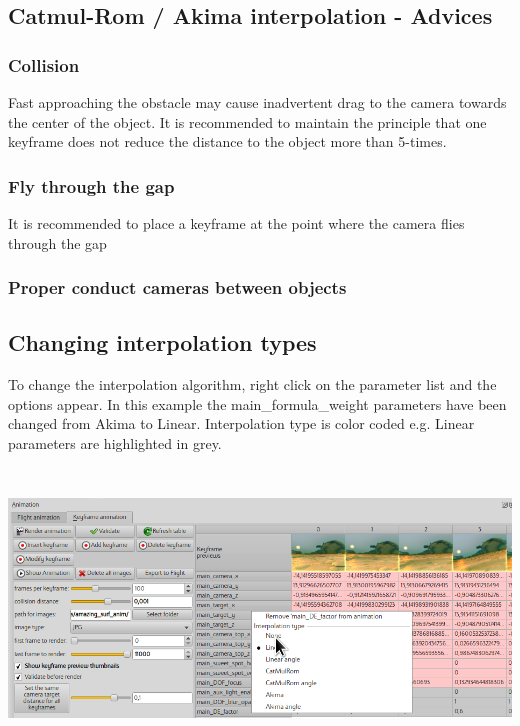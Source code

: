 \subsection{Catmul-Rom / Akima interpolation -
Advices}\label{catmul-rom-akima-interpolation---advices}

\subsubsection{Collision}\label{collision}

Fast approaching the obstacle may cause inadvertent drag to the camera
towards the center of the object. It is recommended to maintain the
principle that one keyframe does not reduce the distance to the object
more than 5-times.

\subsubsection{Fly through the gap}\label{fly-through-the-gap}

It is recommended to place a keyframe at the point where the camera
flies through the gap

\subsubsection{Proper conduct cameras between
objects}\label{proper-conduct-cameras-between-objects}

\subsection{Changing interpolation
types}\label{changing-interpolation-types}

To change the interpolation algorithm, right click on the parameter list
and the options appear. In this example the main\_formula\_weight
parameters have been changed from Akima to Linear. Interpolation type is
color coded e.g. Linear parameters are highlighted in grey.

\includegraphics[width=6.69291in,height=2.92087in]{img/manual/media/image26.png}

